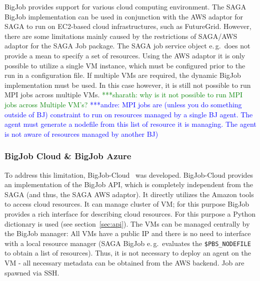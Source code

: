 \documentclass[conference,final]{IEEEtran}
\newcommand{\alnote}[1]{ {\textcolor{blue} { ***andre: #1 }}}
\newcommand{\smnote}[1]{ {\textcolor{green} { ***sharath: #1 }}}
\newcommand{\alnote}[1]{}
\newcommand{\smnote}[1]{}
\begin{document}
BigJob provides support for various cloud computing environment. The SAGA BigJob
implementation can be used in conjunction with the AWS adaptor for SAGA to run
on EC2-based cloud infrastructures, such as FutureGrid. However, there are some 
limitations mainly caused by the restrictions of SAGA/AWS adaptor for the SAGA 
Job package. The SAGA job service object e.\,g.\ does not provide a mean to 
specify a set of resources. Using the AWS adaptor it is only possible to utilize 
a single VM instance, which must be configured prior to the run in a 
configuration file. If multiple VMs are required, the dynamic BigJob 
implementation must be used. In this case however, it is still not possible to 
run MPI jobs across multiple VMs. 
\smnote {why is it not possible to run MPI jobs across Multiple VM's?} \alnote{MPI jobs are (unless you do something outside of BJ) constraint to run
on resources managed by a single BJ agent. The agent must generate a nodefile
from this list of resource it is managing. The agent is not aware of resources
managed by another BJ)}

\subsubsection{BigJob Cloud \& BigJob Azure}

To address this limitation, BigJob-Cloud~\cite{saga_bigjob_condor_cloud} was
developed. BigJob-Cloud provides an implementation of the BigJob API, which is
completely independent from the SAGA (and thus, the SAGA AWS adaptor). It
directly utilizes the Amazon tools to access cloud resources. It can manage
cluster of VM; for this purpose BigJob provides a rich interface for describing
cloud resources. For this purpose a Python dictionary is used (see
section~\ref{sec:api}). The VMs can be managed centrally by the BigJob manager:
All VMs have a public IP and there is no need to interface with a local resource
manager (SAGA BigJob e.\,g.\ evaluates the \texttt{\$PBS\_NODEFILE} to obtain a
list of resources). Thus, it is not necessary to deploy an agent on the VM - all
necessary metadata can be obtained from the AWS backend. Job are spawned via
SSH.

\end{document}
